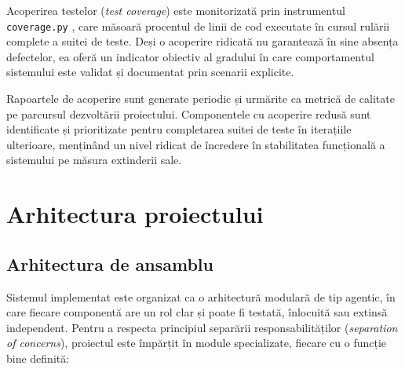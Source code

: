 \documentclass[12pt, a4paper, oneside, romanian]{teza-upb}
\begin{document}
Acoperirea testelor (\textit{test coverage}) este monitorizată prin instrumentul \texttt{coverage.py} \cite{coveragepy_doc}, care măsoară procentul de linii de cod executate în cursul rulării complete a suitei de teste. Deși o acoperire ridicată nu garantează în sine absența defectelor, ea oferă un indicator obiectiv al gradului în care comportamentul sistemului este validat și documentat prin scenarii explicite.

Rapoartele de acoperire sunt generate periodic și urmărite ca metrică de calitate pe parcursul dezvoltării proiectului. Componentele cu acoperire redusă sunt identificate și prioritizate pentru completarea suitei de teste în iterațiile ulterioare, menținând un nivel ridicat de încredere în stabilitatea funcțională a sistemului pe măsura extinderii sale.

\chapter{Arhitectura proiectului}

\section{Arhitectura de ansamblu}
\label{sec:ansamblu}

Sistemul implementat este organizat ca o arhitectură modulară de tip agentic, în care fiecare componentă are un rol clar și poate fi testată, înlocuită sau extinsă independent. Pentru a respecta principiul separării responsabilităților (\textit{separation of concerns}), proiectul este împărțit în module specializate, fiecare cu o funcție bine definită:
\end{document}
